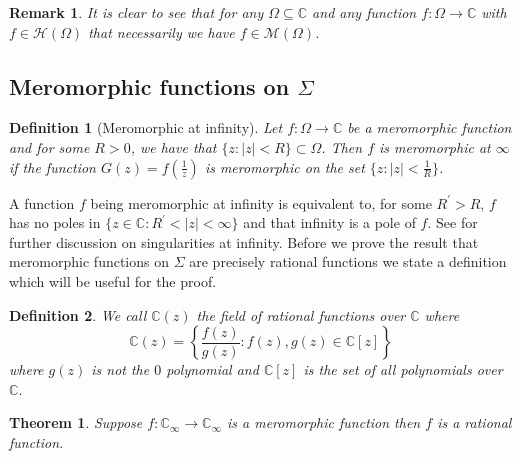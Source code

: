 \documentclass{article}
\newtheorem*{definition}{Definition}
\newtheorem*{theorem}{Theorem}
\newtheorem*{remark}{Remark}
\begin{document}
\begin{remark}
It is clear to see that for any $\Omega\subseteq\mathbb{C}$ and any function $f:\Omega\to\mathbb{C}$ with $f\in\mathcal{H}(\Omega)$ that necessarily we have $f\in\mathcal{M}(\Omega)$.
\end{remark}

\subsection*{Meromorphic functions on $\Sigma$}
\begin{definition}[Meromorphic at infinity]
Let $f:\Omega\to\mathbb{C}$ be a meromorphic function and for some $R>0$, we have that $\{z:|z|<R\}\subset\Omega$. Then $f$ is meromorphic at $\infty$ if the function $G(z)=f(\frac{1}{z})$ is meromorphic on the set $\{z:|z|<\frac{1}{R}\}$. 
\end{definition}
A function $f$ being meromorphic at infinity is equivalent to, for some $R^{'}>R$, $f$ has no poles in \newline $\{z\in\mathbb{C}:R^{'}<|z|<\infty\}$ and that infinity is a pole of $f$. See \cite[Chapter~4]{Krantz} for further discussion on singularities at infinity.
Before we prove the result that meromorphic functions on $\Sigma$ are precisely rational functions we state a definition which will be useful for the proof.

\begin{definition}
We call $\mathbb{C}(z)$ the field of rational functions over $\mathbb{C}$ where 
\[ \mathbb{C}(z)=\left\{\frac{f(z)}{g(z)}: f(z),g(z)\in\mathbb{C}[z]\right\} \]
where $g(z)$ is not the $0$ polynomial and $\mathbb{C}[z]$ is the set of all polynomials over $\mathbb{C}$.
\end{definition}

\begin{theorem}
Suppose $f:\mathbb{C_{\infty}}\to\mathbb{C_{\infty}}$ is a meromorphic function then $f$ is a rational function.
\end{theorem}
\end{document}
